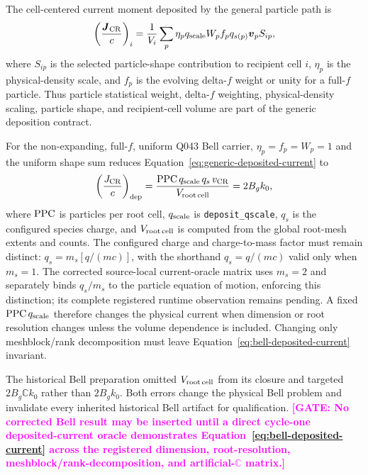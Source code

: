 \documentclass[twocolumn]{aastex701}
\newcommand{\GATE}[1]{\textcolor{magenta}{\textbf{[GATE: #1]}}}
\begin{document}
The cell-centered current moment deposited by the general particle path is
\begin{equation}
\left(\frac{\boldsymbol{J}_{\rm CR}}{c}\right)_i
=
\frac{1}{V_i}\sum_p
\eta_p q_{\rm scale} W_p f_p q_{s(p)}
\boldsymbol{v}_p S_{ip},
\label{eq:generic-deposited-current}
\end{equation}
where $S_{ip}$ is the selected particle-shape contribution to recipient cell
$i$, $\eta_p$ is the physical-density scale, and $f_p$ is the evolving
delta-$f$ weight or unity for a full-$f$ particle. Thus particle statistical
weight, delta-$f$ weighting, physical-density scaling, particle shape, and
recipient-cell volume are part of the generic deposition contract.

For the non-expanding, full-$f$, uniform Q043 Bell carrier, $\eta_p=f_p=W_p=1$
and the uniform shape sum reduces Equation~\ref{eq:generic-deposited-current}
to
\begin{equation}
\left(\frac{J_{\rm CR}}{c}\right)_{\rm dep}
=
\frac{{\rm PPC}\,q_{\rm scale}\,q_s\,v_{\rm CR}}
     {V_{\rm root\,cell}}
=2B_gk_0,
\label{eq:bell-deposited-current}
\end{equation}
where ${\rm PPC}$ is particles per root cell, $q_{\rm scale}$ is
\texttt{deposit\_qscale}, $q_s$ is the configured species charge, and
$V_{\rm root\,cell}$ is computed from the global root-mesh extents and counts.
The configured charge and charge-to-mass factor must remain distinct:
$q_s=m_s[q/(mc)]$, with the shorthand $q_s=q/(mc)$ valid only when $m_s=1$.
The corrected source-local current-oracle matrix uses $m_s=2$ and separately
binds $q_s/m_s$ to the particle equation of motion, enforcing this distinction;
its complete registered runtime observation remains pending. A fixed
${\rm PPC}\,q_{\rm scale}$ therefore changes the physical current when
dimension or root resolution changes unless the volume dependence is included.
Changing only meshblock/rank decomposition must leave
Equation~\ref{eq:bell-deposited-current} invariant.

The historical Bell preparation omitted $V_{\rm root\,cell}$ from its closure
and targeted $2B_g\mathbb{C}k_0$ rather than $2B_gk_0$. Both errors change the
physical Bell problem and invalidate every inherited historical Bell artifact
for qualification.
\GATE{No corrected Bell result may be inserted until a direct cycle-one
deposited-current oracle demonstrates Equation~\ref{eq:bell-deposited-current} across the
registered dimension, root-resolution, meshblock/rank-decomposition, and
artificial-$\mathbb{C}$ matrix.}
\end{document}
